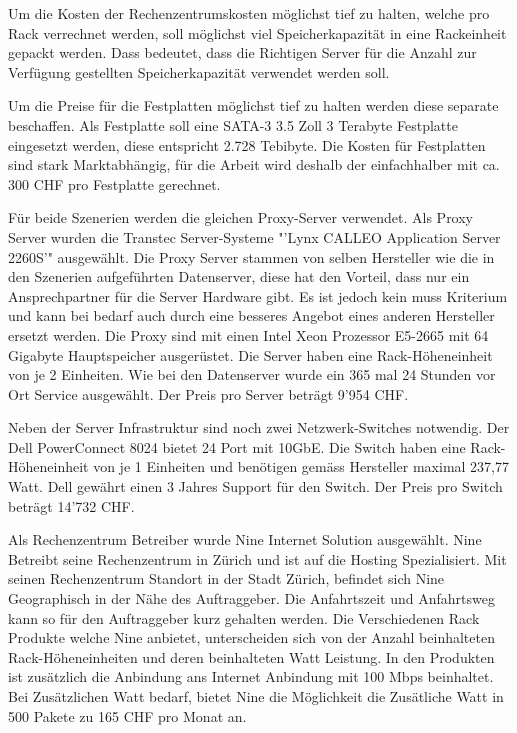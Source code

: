 Um die Kosten der Rechenzentrumskosten möglichst tief zu halten, welche pro Rack verrechnet werden, soll möglichst viel Speicherkapazität in eine Rackeinheit gepackt werden. Dass bedeutet, dass die Richtigen Server für die Anzahl zur Verfügung gestellten Speicherkapazität verwendet werden soll.

Um die Preise für die Festplatten möglichst tief zu halten werden diese separate beschaffen. Als Festplatte soll eine SATA-3 3.5 Zoll 3 Terabyte Festplatte eingesetzt werden, diese entspricht 2.728 Tebibyte. Die Kosten für Festplatten sind stark Marktabhängig, für die Arbeit wird deshalb der einfachhalber mit ca. 300 CHF pro Festplatte gerechnet.

Für beide Szenerien werden die gleichen Proxy-Server verwendet. Als Proxy Server wurden die Transtec Server-Systeme "'Lynx CALLEO Application Server 2260S'" ausgewählt. Die Proxy Server stammen von selben Hersteller wie die in den Szenerien aufgeführten Datenserver, diese hat den Vorteil, dass nur ein Ansprechpartner für die Server Hardware gibt. Es ist jedoch kein muss Kriterium und kann bei bedarf auch durch eine besseres Angebot eines anderen Hersteller ersetzt werden. Die Proxy sind mit einen Intel Xeon Prozessor E5-2665 mit 64 Gigabyte Hauptspeicher ausgerüstet. Die Server haben eine Rack-Höheneinheit von je 2 Einheiten. Wie bei den Datenserver wurde ein 365 mal 24 Stunden vor Ort Service ausgewählt. Der Preis pro Server beträgt 9'954 CHF.

Neben der Server Infrastruktur sind noch zwei Netzwerk-Switches notwendig. Der Dell PowerConnect 8024 bietet 24 Port mit 10GbE. Die Switch haben eine Rack-Höheneinheit von je 1 Einheiten und benötigen gemäss Hersteller maximal 237,77 Watt. Dell gewährt einen 3 Jahres Support für den Switch. Der Preis pro Switch beträgt 14'732 CHF.

Als Rechenzentrum Betreiber wurde Nine Internet Solution ausgewählt. Nine Betreibt seine Rechenzentrum in Zürich und ist auf die Hosting Spezialisiert. Mit seinen Rechenzentrum Standort in der Stadt Zürich, befindet sich Nine Geographisch in der Nähe des Auftraggeber. Die Anfahrtszeit und Anfahrtsweg kann so für den Auftraggeber kurz gehalten werden. Die Verschiedenen Rack Produkte welche Nine anbietet, unterscheiden sich von der Anzahl beinhalteten Rack-Höheneinheiten und deren beinhalteten Watt Leistung. In den Produkten ist zusätzlich die Anbindung ans  Internet Anbindung mit 100 Mbps beinhaltet. Bei Zusätzlichen Watt bedarf, bietet Nine die Möglichkeit die Zusätliche Watt in 500 Pakete zu 165 CHF pro Monat an.


